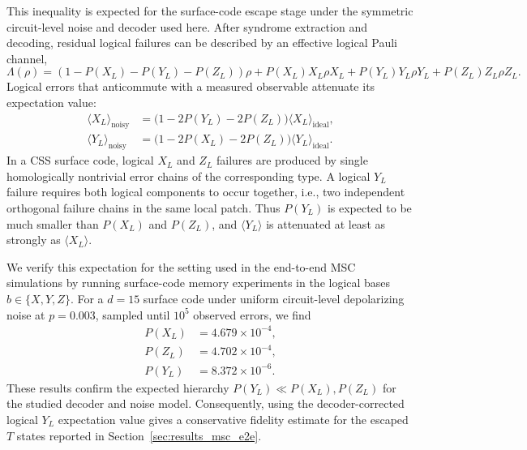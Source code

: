 \documentclass[a4paper, onecolumn, unpublished]{quantumarticle}
\begin{document}
    This inequality is expected for the surface-code escape stage under the symmetric circuit-level noise and decoder used here. After syndrome extraction and decoding, residual logical failures can be described by an effective logical Pauli channel,
    \begin{equation}
        \Lambda(\rho)
        =
        (1 - P(X_L) - P(Y_L) - P(Z_L))\rho
        + P(X_L) X_L\rho X_L
        + P(Y_L) Y_L\rho Y_L
        + P(Z_L) Z_L\rho Z_L .
    \end{equation}
    Logical errors that anticommute with a measured observable attenuate its expectation value:
    \begin{align}
        \label{eq:logical_attenuation}
        \langle X_L \rangle_{\mathrm{noisy}}
        &=
        \bigl(1 - 2P(Y_L) - 2P(Z_L)\bigr)
        \langle X_L \rangle_{\mathrm{ideal}},
        \\
        \langle Y_L \rangle_{\mathrm{noisy}}
        &=
        \bigl(1 - 2P(X_L) - 2P(Z_L)\bigr)
        \langle Y_L \rangle_{\mathrm{ideal}} .
    \end{align}
    In a CSS surface code, logical $X_L$ and $Z_L$ failures are produced by single homologically nontrivial error chains of the corresponding type. A logical $Y_L$ failure requires both logical components to occur together, i.e., two independent orthogonal failure chains in the same local patch. Thus $P(Y_L)$ is expected to be much smaller than $P(X_L)$ and $P(Z_L)$, and $\langle Y_L\rangle$ is attenuated at least as strongly as $\langle X_L\rangle$.

    We verify this expectation for the setting used in the end-to-end MSC simulations by running surface-code memory experiments in the logical bases $b \in \{X,Y,Z\}$. For a $d=15$ surface code under uniform circuit-level depolarizing noise at $p=0.003$, sampled until $10^5$ observed errors, we find
    \begin{align}
        P(X_L) &= 4.679 \times 10^{-4}, \nonumber \\
        P(Z_L) &= 4.702 \times 10^{-4}, \nonumber \\
        P(Y_L) &= 8.372 \times 10^{-6}. \nonumber
    \end{align}
    These results confirm the expected hierarchy $P(Y_L) \ll P(X_L), P(Z_L)$ for the studied decoder and noise model. Consequently, using the decoder-corrected logical $Y_L$ expectation value gives a conservative fidelity estimate for the escaped $T$ states reported in Section~\ref{sec:results_msc_e2e}.
\end{document}
